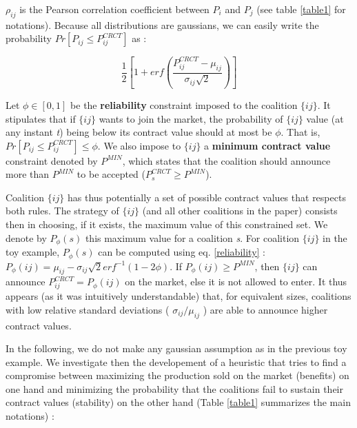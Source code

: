 \documentclass[conference]{IEEEtran}
\begin{document}
$ \rho_{ij} $ is the Pearson correlation coefficient between $ P_{i} $ and $ P_{j} $ (see table \ref{table1} for notations). Because all distributions are gaussians, we can easily write the probability $ Pr[P_{ij} \leq P_{ij}^{CRCT} ] $ as :

\begin{equation}
\dfrac{1}{2} \left[ 1+ erf \left( \dfrac{P_{ij}^{CRCT} - \mu_{ij}}{\sigma_{ij}\sqrt{2}} \right) \right]
\label{reliability}
\end{equation}

Let $ \phi \in [0,1] $ be the \textbf{reliability} constraint imposed to the coalition $\{ij\} $. It stipulates that if $\{ij\} $ wants to join the market, the probability of $\{ij\} $ value (at any instant \textit{t}) being below its contract value should at most be $ \phi $. That is, $ Pr[P_{ij} \leq P_{ij}^{CRCT} ] \leq \phi $. We also impose to $ \{ij\} $ a \textbf{minimum contract value} constraint denoted by $ P^{MIN} $, which states that the coalition should announce more than $ P^{MIN} $ to be accepted ($ P_{s}^{CRCT} \geq P^{MIN} $).

Coalition $ \{ij\} $ has thus potentially a set of possible contract values that respects both rules. The strategy of $ \{ij\} $ (and all other coalitions in the paper) consists then in choosing, if it exists, the maximum value of this constrained set. We denote by $ P_{\phi}(s) $ this maximum value for a coalition \textit{s}. For coalition $ \{ij\} $ in the toy example, $ P_{\phi}(s) $ can be computed using eq. \ref{reliability} : $ P_{\phi}(ij) = \mu_{ij} - \sigma_{ij}\sqrt{2}erf^{-1}(1-2 \phi ) $. If  $ P_{\phi}(ij) \geq P^{MIN} $, then $ \{ij\} $ can announce $ P_{ij}^{CRCT} = P_{\phi}(ij)$ on the market, else it is not allowed to enter. It thus appears (as it was intuitively understandable) that, for equivalent sizes, coalitions with low relative standard deviations ( $ \sigma_{ij} / \mu_{ij} $ ) are able to announce higher contract values. 


In the following, we do not make any gaussian assumption as in the previous toy example. We investigate then the developement of a heuristic that tries to find a compromise between maximizing the production sold on the market (benefits) on one hand and minimizing the probability that the coalitions fail to sustain their contract values (stability) on the other hand (Table \ref{table1} summarizes the main notations) :
\end{document}
